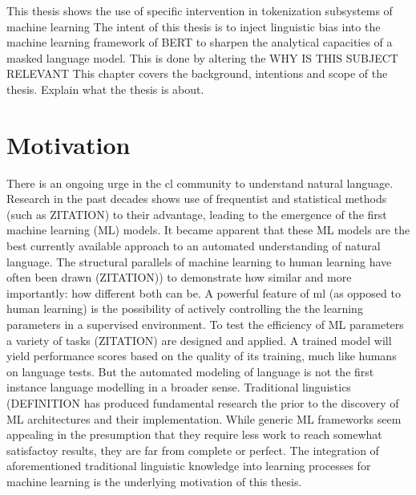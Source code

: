 
This thesis shows the use of specific intervention in tokenization subsystems of machine learning
The intent of this thesis is to inject linguistic bias into the machine learning framework of BERT to sharpen the analytical capacities of a masked language model.
This is done by altering the \uppercase{Why is this subject relevant}
This chapter covers the background, intentions and scope of the thesis.
Explain what the thesis is about.


\section{Motivation}
\label{sec:motivation}
There is an ongoing urge in the \acf{cl} community to understand natural language.
Research in the past decades shows use of frequentist and statistical methods (such as \uppercase{ZITATION}) to their advantage, leading to the emergence of the first machine learning (ML) models.
It became apparent that these ML models are the best currently available approach to an automated understanding of natural language.
The structural parallels of machine learning to human learning have often been drawn (\uppercase{zitation)}) to demonstrate how similar and more importantly: how different both can be.
A powerful feature of \ac{ml} (as opposed to human learning) is the possibility of actively controlling the the learning parameters in a supervised environment.
To test the efficiency of \uppercase{ML} parameters a variety of tasks (\uppercase{zitation}) are designed and applied.
A trained model will yield performance scores based on the quality of its training, much like humans on language tests.
But the automated modeling of language is not the first instance language modelling in a broader sense.
Traditional linguistics (\uppercase{definition} has produced fundamental research the prior to the discovery of \uppercase{ML} architectures and their implementation.
While generic ML frameworks seem appealing in the presumption that they require less work to reach somewhat satisfactoy results,
they are far from complete or perfect.
The integration of aforementioned traditional linguistic knowledge into learning processes for machine learning is the underlying motivation of this thesis.

